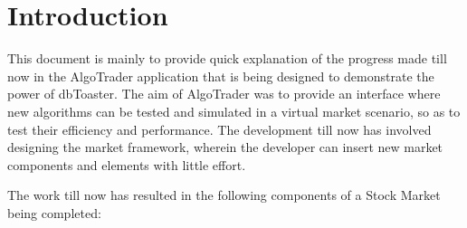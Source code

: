 \documentclass{amsart}
\begin{document}
\section{Introduction}

This document is mainly to provide quick explanation of the progress made till
now in the AlgoTrader application that is being designed to demonstrate the
power of dbToaster. The aim of AlgoTrader was to provide an interface where
new algorithms can be tested and simulated in a virtual market scenario, so as
to test their efficiency and performance. The development till now has
involved designing the market framework, wherein the developer can insert new
market components and elements with little effort.

The work till now has resulted in the following components of a Stock Market
being completed:
\end{document}
